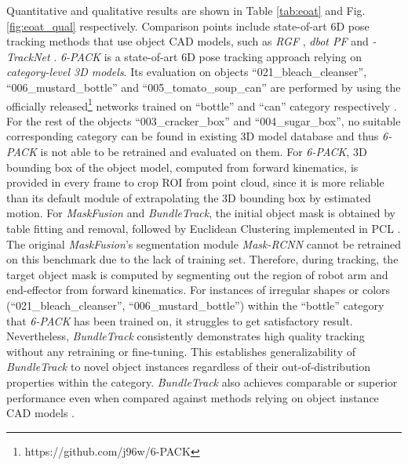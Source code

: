 \documentclass[letterpaper, 10 pt, conference]{ieeeconf}
\begin{document}
Quantitative and qualitative results are shown in Table \ref{tab:eoat} and Fig. \ref{fig:eoat_qual} respectively. Comparison points include state-of-art 6D pose tracking methods that use object CAD models, such as \textit{RGF} \cite{issac2016depth}, \textit{dbot PF} \cite{Wthrich2013ProbabilisticOT} and \textit{-TrackNet} \cite{wense3tracknet}. \textit{6-PACK} \cite{wang20196-pack} is a state-of-art 6D pose tracking approach relying on \textit{category-level 3D models}. Its evaluation on objects ``021\_bleach\_cleanser'', ``006\_mustard\_bottle'' and ``005\_tomato\_soup\_can'' are performed by using the officially released\footnote{https://github.com/j96w/6-PACK} networks trained on ``bottle'' and ``can'' category respectively . For the rest of the objects ``003\_cracker\_box'' and ``004\_sugar\_box'', no suitable corresponding category can be found in existing 3D model database \cite{chang2015shapenet} and thus \textit{6-PACK} is not able to be retrained and evaluated on them. For \textit{6-PACK}, 3D bounding box of the object model, computed from forward kinematics, is provided in every frame to crop ROI from point cloud, since it is more reliable than its default module of extrapolating the 3D bounding box by estimated motion.
For \textit{MaskFusion} \cite{runz2018maskfusion} and \textit{BundleTrack}, the initial object mask is obtained by table fitting and removal, followed by Euclidean Clustering implemented in PCL \cite{rusu20113d}. The original \textit{MaskFusion}'s segmentation module \textit{Mask-RCNN} cannot be retrained on this benchmark due to the lack of training set. Therefore, during tracking, the target object mask is computed by segmenting out the region of robot arm and end-effector from forward kinematics. For instances of irregular shapes or colors (``021\_bleach\_cleanser'', ``006\_mustard\_bottle'')  within the ``bottle'' category that \textit{6-PACK} has been trained on, it struggles to get satisfactory result. Nevertheless, \textit{BundleTrack} consistently demonstrates high quality tracking without any retraining or fine-tuning. This establishes generalizability of \textit{BundleTrack} to novel object instances regardless of their out-of-distribution properties within the category.  \textit{BundleTrack} also achieves comparable or superior performance even when compared against methods relying on object instance CAD models \cite{issac2016depth,Wthrich2013ProbabilisticOT,wense3tracknet}. 





\vspace{-0.0in}
\end{document}
